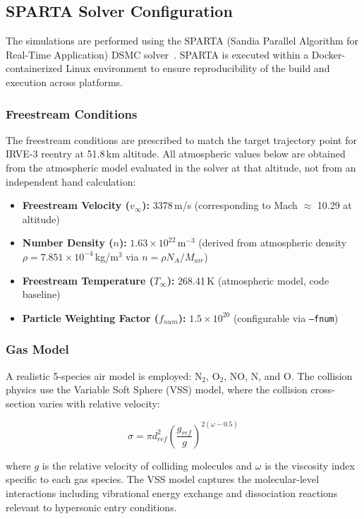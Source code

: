 \subsection{SPARTA Solver Configuration}
The simulations are performed using the SPARTA (Sandia Parallel Algorithm for Real-Time Application) DSMC solver~\cite{plimpton2014sparta}. SPARTA is executed within a Docker-containerized Linux environment to ensure reproducibility of the build and execution across platforms.

\subsubsection*{Freestream Conditions}
The freestream conditions are prescribed to match the target trajectory point for IRVE-3 reentry at 51.8\,km altitude. All atmospheric values below are obtained from the atmospheric model evaluated in the solver at that altitude, not from an independent hand calculation:

\begin{itemize}
    \item \textbf{Freestream Velocity ($v_{\infty}$):} 3378\,m/s (corresponding to Mach $\approx$ 10.29 at altitude)
    \item \textbf{Number Density ($n$):} $1.63 \times 10^{22}$\,m$^{-3}$ (derived from atmospheric density $\rho = 7.851 \times 10^{-4}$\,kg/m$^3$ via $n = \rho N_A / M_{air}$)
    \item \textbf{Freestream Temperature ($T_{\infty}$):} 268.41\,K (atmospheric model, code baseline)
    \item \textbf{Particle Weighting Factor ($f_{num}$):} $1.5 \times 10^{20}$ (configurable via \texttt{--fnum})
\end{itemize}

\subsubsection*{Gas Model}
A realistic 5-species air model is employed: N$_2$, O$_2$, NO, N, and O. The collision physics use the Variable Soft Sphere (VSS) model, where the collision cross-section varies with relative velocity:

\begin{equation}
    \sigma = \pi d_{ref}^2 \left( \frac{g_{ref}}{g} \right)^{2(\omega - 0.5)}
\end{equation}

where $g$ is the relative velocity of colliding molecules and $\omega$ is the viscosity index specific to each gas species. The VSS model captures the molecular-level interactions including vibrational energy exchange and dissociation reactions relevant to hypersonic entry conditions.

